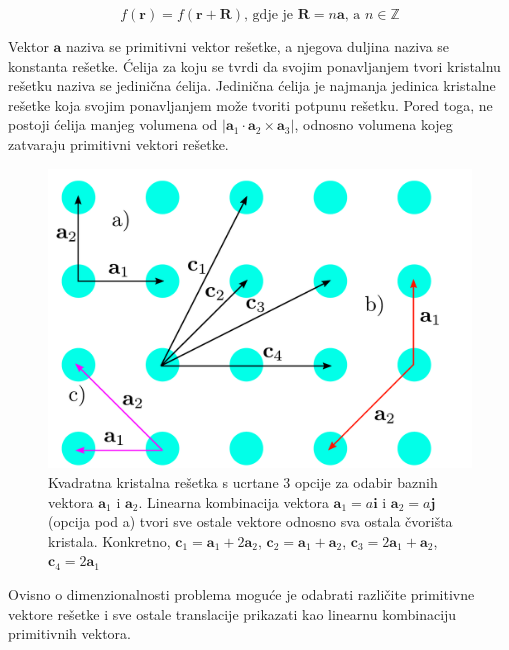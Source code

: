 \documentclass[utf8, seminar]{fer}
\begin{document}
\begin{equation}
	f(\mathbf{r}) = f(\mathbf{r} + \mathbf{R}) \text{, gdje je }{\mathbf{R} =
	n\mathbf{a}} \text{, a } n \in \mathbb{Z}
\end{equation}

Vektor $\mathbf{a}$ naziva se primitivni vektor rešetke, a njegova duljina
naziva se konstanta rešetke. Ćelija za koju se tvrdi da svojim ponavljanjem
tvori kristalnu rešetku naziva se jedinična ćelija. Jedinična ćelija je
najmanja jedinica kristalne rešetke koja svojim ponavljanjem može tvoriti
potpunu rešetku. Pored toga, ne postoji ćelija manjeg volumena od
${|\mathbf{a}_1 \cdot \mathbf{a}_2 \times \mathbf{a}_3|}$, odnosno volumena
kojeg zatvaraju primitivni vektori rešetke.

\begin{figure}[ht]
	\centering
	\includegraphics[width = 1.0\linewidth]{./images/crystal_lattice.pdf}
	\caption{Kvadratna kristalna rešetka s ucrtane 3 opcije za odabir baznih
	vektora $\mathbf{a}_1$ i $\mathbf{a}_2$. Linearna kombinacija vektora
	$\mathbf{a}_1 = a \mathbf{i}$ i $\mathbf{a}_2 = a \mathbf{j}$ (opcija pod a)
	tvori sve ostale vektore odnosno sva ostala čvorišta kristala. Konkretno,
	${\mathbf{c}_1 = \mathbf{a}_1 + 2 \mathbf{a}_2}$,
	${\mathbf{c}_2 = \mathbf{a}_1 + \mathbf{a}_2}$,
	${\mathbf{c}_3 = 2 \mathbf{a}_1 + \mathbf{a}_2}$,
	${\mathbf{c}_4 = 2 \mathbf{a}_1}$}
	\label{fig:crystal_lattice}
\end{figure}

Ovisno o dimenzionalnosti problema moguće je odabrati različite primitivne
vektore rešetke i sve ostale translacije prikazati kao linearnu kombinaciju
primitivnih vektora.
\end{document}
